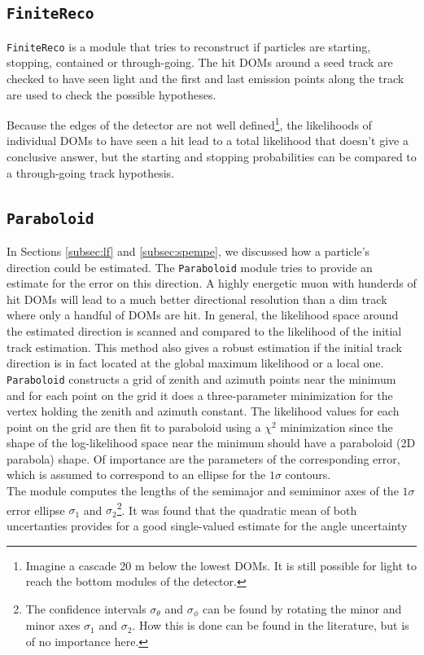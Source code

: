 \subsection{\texttt{FiniteReco}}
\label{subsec:finitereco}
\texttt{FiniteReco} is a module that tries to reconstruct if particles are starting, stopping, contained or through-going. The hit DOMs around a seed track are checked to have seen light and the first and last emission points along the track are used to check the possible hypotheses.

Because the edges of the detector are not well defined\footnote{Imagine a cascade 20 m below the lowest DOMs. It is still possible for light to reach the bottom modules of the detector.}, the likelihoods of individual DOMs to have seen a hit lead to a total likelihood that doesn't give a conclusive answer, but the starting and stopping probabilities can be compared to a through-going track hypothesis.
\subsection{\texttt{Paraboloid}}
\label{subsec:paraboloid}

In Sections \ref{subsec:lf} and \ref{subsec:spempe}, we discussed how a particle's direction could be estimated. The \texttt{Paraboloid} module tries to provide an estimate for the error on this direction. A highly energetic muon with hunderds of hit DOMs will lead to a much better directional resolution than a dim track where only a handful of DOMs are hit. In general, the likelihood space around the estimated direction is scanned and compared to the likelihood of the initial track estimation. This method also gives a robust estimation if the initial track direction is in fact located at the global maximum likelihood or a local one. \texttt{Paraboloid} constructs a grid of zenith and azimuth points near the minimum and for each point on the grid it does a three-parameter minimization for the vertex holding the zenith and azimuth constant. The likelihood values for each point on the grid are then fit to paraboloid using a $\chi^2$ minimization since the shape of the log-likelihood space near the minimum should have a paraboloid (2D parabola) shape. Of importance are the parameters of the corresponding error, which is assumed to correspond to an ellipse for the $1\sigma$ contours.\\

\noindent The module computes the lengths of the semimajor and semiminor axes of the $1\sigma$ error ellipse $\sigma_1$ and $\sigma_2$\footnote{The confidence intervals $\sigma_\theta$ and $\sigma_\phi$ can be found by rotating the minor and minor axes $\sigma_1$ and $\sigma_2$. How this is done can be found in the literature, but is of no importance here.}. It was found that the quadratic mean of both uncertanties provides for a good single-valued estimate for the angle uncertainty

